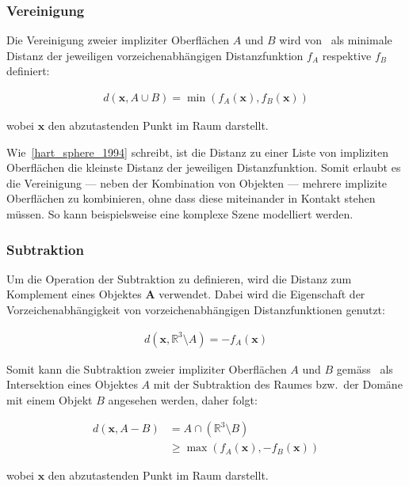 \subsubsection{Vereinigung}
\label{ssubsec:implicit_surfaces_ops_union}

Die Vereinigung zweier impliziter Oberflächen $A$ und $B$ wird
von~\cite{hart_sphere_1994} als minimale Distanz der jeweiligen
vorzeichenabhängigen  Distanzfunktion $f_{A}$ respektive $f_{B}$ definiert:

\begin{gather}
    d(\bm{x}, A \cup B) = \min(f_{A}(\bm{x}), f_{B}(\bm{x}))
\end{gather}

wobei $\bm{x}$ den abzutastenden Punkt im Raum darstellt.

Wie~\ref{hart_sphere_1994} schreibt, ist die Distanz zu einer Liste von
impliziten Oberflächen die kleinste Distanz der jeweiligen Distanzfunktion.
Somit erlaubt es die Vereinigung --- neben der Kombination von Objekten ---
mehrere implizite Oberflächen zu kombinieren, ohne dass diese miteinander in
Kontakt stehen müssen. So kann beispielsweise eine komplexe Szene modelliert
werden.

\subsubsection{Subtraktion}
\label{ssubsec:implicit_surfaces_ops_subtraction}

Um die Operation der Subtraktion zu definieren, wird die Distanz zum Komplement
eines Objektes $\bm{A}$ verwendet. Dabei wird die Eigenschaft der
Vorzeichenabhängigkeit von vorzeichenabhängigen Distanzfunktionen genutzt:

\begin{gather}
    d(\bm{x}, \mathbb{R}^{3} \setminus A) = -f_{A}(\bm{x})
\end{gather}

Somit kann die Subtraktion zweier impliziter Oberflächen $A$ und $B$
gemäss~\cite{hart_sphere_1994} als Intersektion eines Objektes $A$ mit der
Subtraktion des Raumes bzw.\ der Domäne mit einem Objekt $B$ angesehen werden,
daher folgt:

\begin{align}
    d(\bm{x}, A - B) &= A \cap (\mathbb{R}^{3} \setminus B) \\
                     &\geq \max(f_{A}(\bm{x}), -f_{B}(\bm{x}))
\end{align}

wobei $\bm{x}$ den abzutastenden Punkt im Raum darstellt.

